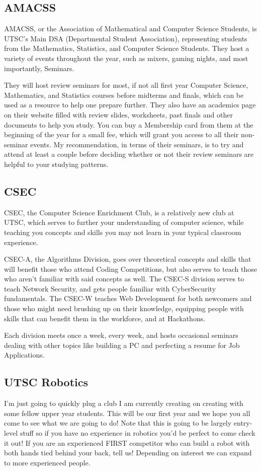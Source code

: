 \documentclass[11pt]{article}
\begin{document}
\subsection{AMACSS}
AMACSS, or the Association of Mathematical and Computer Science Students, is UTSC's Main DSA (Departmental Student Association), representing students from the Mathematics, Statistics, and Computer Science Students. They host a variety of events throughout the year, such as mixers, gaming nights, and most importantly, Seminars.\par
They will host review seminars for most, if not all first year Computer Science, Mathematics, and Statistics courses before midterms and finals, which can be used as a resource to help one prepare further. They also have an academics page on their website filled with review slides, worksheets, past finals and other documents to help you study. You can buy a Membership card from them at the beginning of the year for a small fee, which will grant you access to all their non-seminar events.  My recommendation, in terms of their seminars, is to try and attend at least a couple before deciding whether or not their review seminars are helpful to your studying patterns. 
\subsection{CSEC}
CSEC, the Computer Science Enrichment Club, is a relatively new club at UTSC, which serves to further your understanding of computer science, while teaching you concepts and skills you may not learn in your typical classroom experience.\par
CSEC-A, the Algorithms Division, goes over theoretical concepts and skills that will benefit those who attend Coding Competitions, but also serves to teach those who aren't familiar with said concepts as well.  The CSEC-S division serves to teach Network Security, and gets people familiar with CyberSecurity fundamentals.  The CSEC-W teaches Web Development for both newcomers and those who might need brushing up on their knowledge, equipping people with skills that can benefit them in the workforce, and at Hackathons.\par
Each division meets once a week, every week, and hosts occasional seminars dealing with other topics like building a PC and perfecting a resume for Job Applications.

\subsection{UTSC Robotics}
I'm just going to quickly plug a club I am currently creating on creating with some fellow upper year students. This will be our first year and we hope you all come to see what we are going to do! Note that this is going to be largely entry-level stuff so if you have no experience in robotics you'd be perfect to come check it out! If you are an experienced FIRST competitor who can build a robot with both hands tied behind your back, tell us! Depending on interest we can expand to more experienced people.
\end{document}

